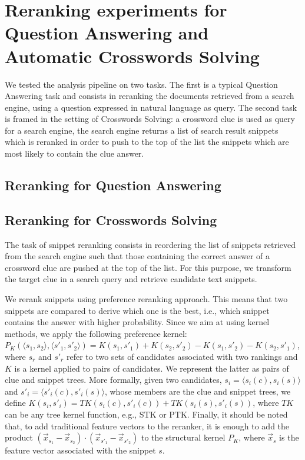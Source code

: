 \documentclass{wileysev}
\begin{document}
\section{Reranking experiments for Question Answering and Automatic Crosswords Solving}

We tested the analysis pipeline on two tasks. The first is a typical Question Answering task and consists in reranking the documents retrieved from a search engine, using a question expressed in natural language as query. The second task is framed in the setting of Crosswords Solving: a crossword clue is used as query for a search engine, the search engine returns a list of search result snippets which is reranked in order to push to the top of the list the snippets which are most likely to contain the clue answer.

\subsection{Reranking for Question Answering}

\subsection{Reranking for Crosswords Solving}

The task of snippet reranking consists in reordering the list of snippets retrieved from the search engine such that those containing the correct answer of a crossword clue are pushed at the top of the list. For this purpose, we transform the target clue in a search query and retrieve candidate text snippets.

We rerank snippets using preference reranking approach. This means that two snippets are compared to derive which one is the best, i.e., which snippet contains the answer with higher probability. Since we aim at using kernel methods, we apply the following preference kernel: $P_K(\langle s_1, s_2 \rangle,\langle s'_1, s'_2 \rangle) = K(s_1,s'_1) +  K(s_2,s'_2) - K(s_1,s'_2) - K(s_2,s'_1)$, where $s_{r}$ and $s'_{r}$ refer to two sets of candidates associated with two rankings and $K$ is a kernel applied to pairs of candidates. We represent the latter as pairs of clue and snippet  trees. More formally, given two candidates, $s_{i}= \langle s_{i}(c), s_{i}(s)\rangle$ and $s'_{i}= \langle s'_{i}(c), s'_{i}(s) \rangle$, whose members are the clue and snippet trees, we define $K(s_i,s'_i) = TK(s_{i}(c), s'_{i}(c))+TK(s_{i}(s), s'_{i}(s))$,
 where $TK$ can be any tree kernel function, e.g., STK or PTK. Finally, it should be noted that, to add traditional feature vectors to the reranker, it is enough to add the product $(\vec x_{s_{1}} - \vec x_{s_{2}}) \cdot (\vec x_{s'_{1}} - \vec x_{s'_{2}})$ to the structural kernel $P_K$, where $\vec x_{s}$ is the feature vector associated with the snippet $s$.
\end{document}
